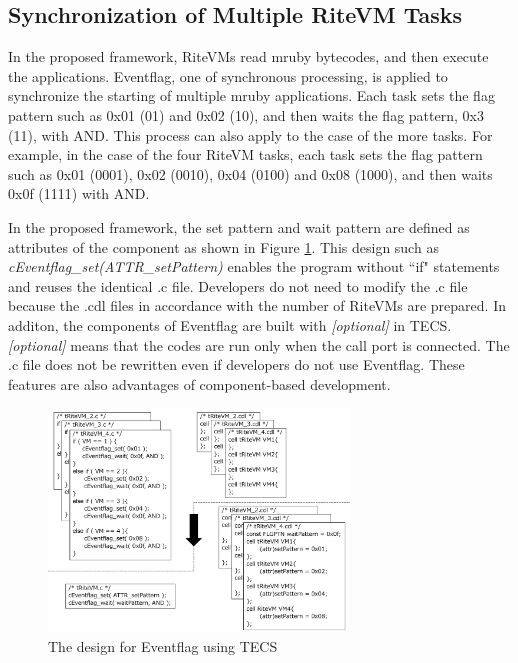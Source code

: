 \documentclass[conference,compsoc]{IEEEtran}
\begin{document}
\subsection{Synchronization of Multiple RiteVM Tasks}
In the proposed framework, RiteVMs read mruby bytecodes, and then execute the applications.
Eventflag, one of synchronous processing, is applied to synchronize the starting of multiple mruby applications.
Each task sets the flag pattern such as 0x01 (01) and 0x02 (10), and then waits the flag pattern, 0x3 (11), with AND.
This process can also apply to the case of the more tasks.
For example, in the case of the four RiteVM tasks, each task sets the flag pattern such as 0x01 (0001), 0x02 (0010), 0x04 (0100)  and 0x08 (1000), and then waits 0x0f (1111) with AND.

In the proposed framework, the set pattern and wait pattern are defined as attributes of the component as shown in Figure \ref{fig:Eventflag}.
This design such as {\it cEventflag\_set(ATTR\_setPattern)} enables the program without ``if" statements and reuses the identical .c file.
Developers do not need to modify the .c file because the .cdl files in accordance with the number of RiteVMs are prepared. 
In additon, the components of Eventflag are built with {\it [optional]} in TECS.
{\it [optional]} means that the codes are run only when the call port is connected.
The .c file does not be rewritten even if developers do not use Eventflag. 
These features are also advantages of component-based development.

\begin{figure}[t]
    \centering
    \includegraphics[width=8cm,clip]{figure/Eventflag.pdf}
    \caption{The design for Eventflag using TECS}
    \label{fig:Eventflag}
\end{figure}
 
\end{document}

